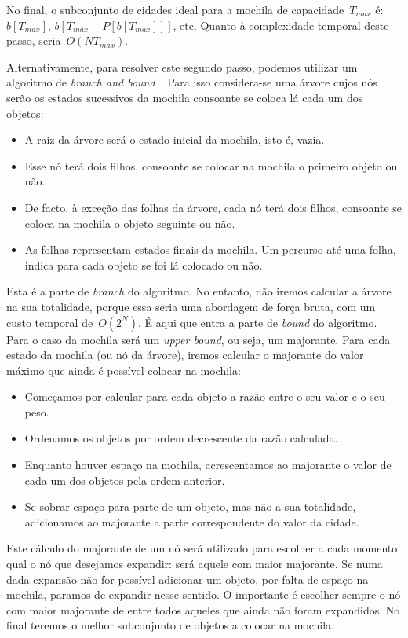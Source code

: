 \documentclass[12pt,a4paper,reqno]{report}
\numberwithin{figure}{section}
\numberwithin{equation}{section}
\numberwithin{figure}{section}
\numberwithin{equation}{section}
\begin{document}
No final, o subconjunto de cidades ideal para a mochila de capacidade~$T_{max}$ é: $b[T_{max}]$, $b[T_{max}-P[b[T_{max}]]]$, etc. Quanto à complexidade temporal deste passo, seria~$O(NT_{max})$.

Alternativamente, para resolver este segundo passo, podemos utilizar um algoritmo de \emph{branch and bound}~\cite{tube_bnb_kp_1, tube_bnb_kp_2, Narahari:2000}. Para isso considera-se uma árvore cujos nós serão os estados sucessivos da mochila consoante se coloca lá cada um dos objetos:
\begin{itemize} 
	\item A raiz da árvore será o estado inicial da mochila, isto é, vazia.
	\item Esse nó terá dois filhos, consoante se colocar na mochila o primeiro objeto ou não.
	\item De facto, à exceção das folhas da árvore, cada nó terá dois filhos, consoante se coloca na mochila o objeto seguinte ou não.
	\item As folhas representam estados finais da mochila. Um percurso até uma folha, indica para cada objeto se foi lá colocado ou não.
\end{itemize}
Esta é a parte de \emph{branch} do algoritmo. No entanto, não iremos calcular a árvore na sua totalidade, porque essa seria uma abordagem de força bruta, com um custo temporal de~$O(2^N)$. É aqui que entra a parte de \emph{bound} do algoritmo. Para o caso da mochila será um \emph{upper bound}, ou seja, um majorante. Para cada estado da mochila (ou nó da árvore), iremos calcular o majorante do valor máximo que ainda é possível colocar na mochila:
\begin{itemize}
	\item Começamos por calcular para cada objeto a razão entre o seu valor e o seu peso.
	\item Ordenamos os objetos por ordem decrescente da razão calculada.
	\item Enquanto houver espaço na mochila, acrescentamos ao majorante o valor de cada um dos objetos pela ordem anterior.
	\item Se sobrar espaço para parte de um objeto, mas não a sua totalidade, adicionamos ao majorante a parte correspondente do valor da cidade.
\end{itemize}
Este cálculo do majorante de um nó será utilizado para escolher a cada momento qual o nó que desejamos expandir: será aquele com maior majorante. Se numa dada expansão não for possível adicionar um objeto, por falta de espaço na mochila, paramos de expandir nesse sentido. O importante é escolher sempre o nó com maior majorante de entre todos aqueles que ainda não foram expandidos. No final teremos o melhor subconjunto de objetos a colocar na mochila.
\end{document}
